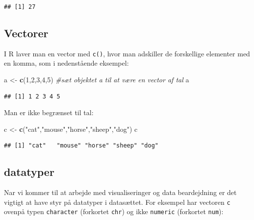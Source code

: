 \documentclass[
]{book}
\newenvironment{Shaded}{\begin{snugshade}}{\end{snugshade}}
\newcommand{\CommentTok}[1]{\textcolor[rgb]{0.56,0.35,0.01}{\textit{#1}}}
\newcommand{\DecValTok}[1]{\textcolor[rgb]{0.00,0.00,0.81}{#1}}
\newcommand{\FunctionTok}[1]{\textcolor[rgb]{0.13,0.29,0.53}{\textbf{#1}}}
\newcommand{\NormalTok}[1]{#1}
\newcommand{\OtherTok}[1]{\textcolor[rgb]{0.56,0.35,0.01}{#1}}
\newcommand{\StringTok}[1]{\textcolor[rgb]{0.31,0.60,0.02}{#1}}
\begin{document}
\begin{verbatim}
## [1] 27
\end{verbatim}

\subsection{Vectorer}\label{vectorer}

I R laver man en vector med \texttt{c()}, hvor man adskiller de forskellige elementer med en komma, som i nedenstående eksempel:

\begin{Shaded}
\begin{Highlighting}[]
\NormalTok{a }\OtherTok{\textless{}{-}} \FunctionTok{c}\NormalTok{(}\DecValTok{1}\NormalTok{,}\DecValTok{2}\NormalTok{,}\DecValTok{3}\NormalTok{,}\DecValTok{4}\NormalTok{,}\DecValTok{5}\NormalTok{) }\CommentTok{\#sæt objektet \textquotesingle{}a\textquotesingle{} til at være en vector af tal }
\NormalTok{a}
\end{Highlighting}
\end{Shaded}

\begin{verbatim}
## [1] 1 2 3 4 5
\end{verbatim}

Man er ikke begrænset til tal:

\begin{Shaded}
\begin{Highlighting}[]
\NormalTok{c }\OtherTok{\textless{}{-}} \FunctionTok{c}\NormalTok{(}\StringTok{"cat"}\NormalTok{,}\StringTok{"mouse"}\NormalTok{,}\StringTok{"horse"}\NormalTok{,}\StringTok{"sheep"}\NormalTok{,}\StringTok{"dog"}\NormalTok{)}
\NormalTok{c}
\end{Highlighting}
\end{Shaded}

\begin{verbatim}
## [1] "cat"   "mouse" "horse" "sheep" "dog"
\end{verbatim}

\subsection{datatyper}\label{datatyper}

Nar vi kommer til at arbejde med visualiseringer og data beardejdning er det vigtigt at have styr på datatyper i datasættet. For eksempel har vectoren \texttt{c} ovenpå typen \texttt{character} (forkortet \texttt{chr}) og ikke \texttt{numeric} (forkortet \texttt{num}):
\end{document}
